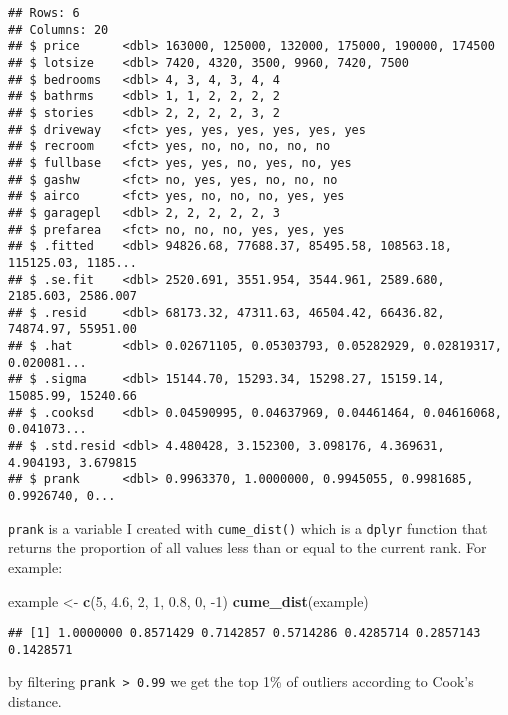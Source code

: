 \documentclass[
]{article}
\newenvironment{Shaded}{\begin{snugshade}}{\end{snugshade}}
\newcommand{\DecValTok}[1]{\textcolor[rgb]{0.00,0.00,0.81}{#1}}
\newcommand{\FloatTok}[1]{\textcolor[rgb]{0.00,0.00,0.81}{#1}}
\newcommand{\KeywordTok}[1]{\textcolor[rgb]{0.13,0.29,0.53}{\textbf{#1}}}
\newcommand{\NormalTok}[1]{#1}
\newcommand{\StringTok}[1]{\textcolor[rgb]{0.31,0.60,0.02}{#1}}
\begin{document}
\begin{verbatim}
## Rows: 6
## Columns: 20
## $ price      <dbl> 163000, 125000, 132000, 175000, 190000, 174500
## $ lotsize    <dbl> 7420, 4320, 3500, 9960, 7420, 7500
## $ bedrooms   <dbl> 4, 3, 4, 3, 4, 4
## $ bathrms    <dbl> 1, 1, 2, 2, 2, 2
## $ stories    <dbl> 2, 2, 2, 2, 3, 2
## $ driveway   <fct> yes, yes, yes, yes, yes, yes
## $ recroom    <fct> yes, no, no, no, no, no
## $ fullbase   <fct> yes, yes, no, yes, no, yes
## $ gashw      <fct> no, yes, yes, no, no, no
## $ airco      <fct> yes, no, no, no, yes, yes
## $ garagepl   <dbl> 2, 2, 2, 2, 2, 3
## $ prefarea   <fct> no, no, no, yes, yes, yes
## $ .fitted    <dbl> 94826.68, 77688.37, 85495.58, 108563.18, 115125.03, 1185...
## $ .se.fit    <dbl> 2520.691, 3551.954, 3544.961, 2589.680, 2185.603, 2586.007
## $ .resid     <dbl> 68173.32, 47311.63, 46504.42, 66436.82, 74874.97, 55951.00
## $ .hat       <dbl> 0.02671105, 0.05303793, 0.05282929, 0.02819317, 0.020081...
## $ .sigma     <dbl> 15144.70, 15293.34, 15298.27, 15159.14, 15085.99, 15240.66
## $ .cooksd    <dbl> 0.04590995, 0.04637969, 0.04461464, 0.04616068, 0.041073...
## $ .std.resid <dbl> 4.480428, 3.152300, 3.098176, 4.369631, 4.904193, 3.679815
## $ prank      <dbl> 0.9963370, 1.0000000, 0.9945055, 0.9981685, 0.9926740, 0...
\end{verbatim}

\texttt{prank} is a variable I created with \texttt{cume\_dist()} which is a \texttt{dplyr} function that returns the
proportion of all values less than or equal to the current rank. For example:

\begin{Shaded}
\begin{Highlighting}[]
\NormalTok{example \textless{}{-}}\StringTok{ }\KeywordTok{c}\NormalTok{(}\DecValTok{5}\NormalTok{, }\FloatTok{4.6}\NormalTok{, }\DecValTok{2}\NormalTok{, }\DecValTok{1}\NormalTok{, }\FloatTok{0.8}\NormalTok{, }\DecValTok{0}\NormalTok{, }\DecValTok{{-}1}\NormalTok{)}
\KeywordTok{cume\_dist}\NormalTok{(example)}
\end{Highlighting}
\end{Shaded}

\begin{verbatim}
## [1] 1.0000000 0.8571429 0.7142857 0.5714286 0.4285714 0.2857143 0.1428571
\end{verbatim}

by filtering \texttt{prank\ \textgreater{}\ 0.99} we get the top 1\% of outliers according to Cook's distance.
\end{document}
